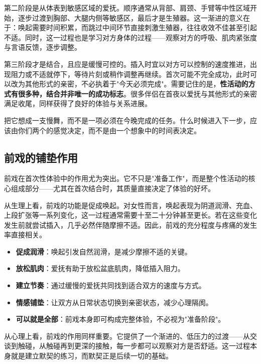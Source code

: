 \documentclass[12pt,UTF8]{ctexbook}
\newcommand{\keyword}[1]{\textbf{#1}}
\begin{document}
第二阶段是从体表到敏感区域的爱抚。顺序通常从背部、肩颈、手臂等中性区域开始，逐步过渡到胸部、大腿内侧等敏感区，最后才是生殖器。这一渐进的意义在于：唤起需要时间积累，而跳过中间环节直接刺激生殖器，往往收效不佳甚至引起不适。同时，这一过程也是学习对方身体的过程——观察对方的呼吸、肌肉紧张度与言语反馈，逐步调整。

第三阶段才是结合，且应是缓慢可控的。插入时宜以对方可以控制的速度推进，出现阻力或不适就停下，等待片刻或稍作调整再继续。首次可能不完全成功，此时可以改为其他形式的亲密，不必执着于"今天必须完成"。需要记住的是，\keyword{性活动的方式有很多种，结合并非唯一的成功标志}。很多伴侣在首夜以爱抚与其他形式的亲密满足收尾，同样获得了良好的体验与关系进展。

\begin{tcolorbox}[colback=pink!5!white,colframe=red!50!black,title=贴心小叮咛]
	把它想成一支慢舞，而不是一项必须在今晚完成的任务。什么时候进入下一步，应该由你们两个的感觉决定，而不是由一个想象中的时间表决定。
\end{tcolorbox}
\subsection{前戏的铺垫作用}

前戏在首次性体验中的作用尤为突出。它不只是"准备工作"，而是整个性活动的核心组成部分——尤其在首次结合时，其质量直接决定了体验的好坏。

从生理上看，前戏的功能是促成唤起。对女性而言，唤起表现为阴道润滑、充血、上段扩张等一系列变化，这一过程通常需要十至二十分钟甚至更长。若在这些变化发生前就尝试插入，几乎必然伴随摩擦不适。因此，前戏的充分程度与疼痛的发生率直接相关。

\begin{itemize}
	\item \keyword{促成润滑}：唤起引发自然润滑，是减少摩擦不适的关键。
	\item \keyword{放松肌肉}：爱抚有助于放松盆底肌肉，降低插入阻力。
	\item \keyword{建立节奏}：通过缓慢的爱抚共同找到适合双方的速度与方式。
	\item \keyword{情感铺垫}：让双方从日常状态切换到亲密状态，减少心理隔阂。
	\item \keyword{可以就是全部}：前戏本身即可构成完整体验，不必视为"准备阶段"。
\end{itemize}

从心理上看，前戏的作用同样重要。它提供了一个渐进的、低压力的过渡——从交谈到触碰，从触碰再到更深的接触，每一步都可以观察对方是否舒适。这一过程本身就是建立默契的练习，而默契正是后续一切的基础。
\end{document}
